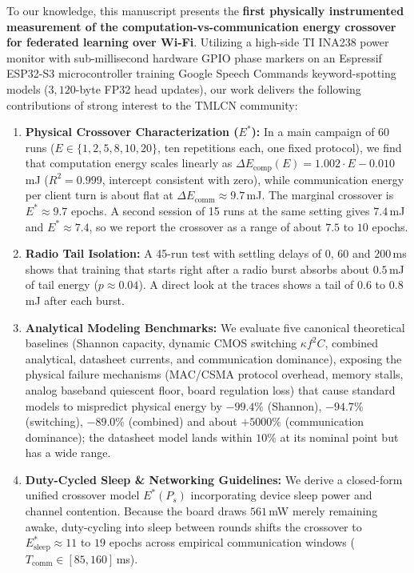 \documentclass[11pt,a4paper]{article}
\begin{document}
\vspace{0.5em}
\noindent
To our knowledge, this manuscript presents the \textbf{first physically instrumented measurement of the computation-vs-communication energy crossover for federated learning over Wi-Fi}. Utilizing a high-side TI INA238 power monitor with sub-millisecond hardware GPIO phase markers on an Espressif ESP32-S3 microcontroller training Google Speech Commands keyword-spotting models ($3{,}120$-byte FP32 head updates), our work delivers the following contributions of strong interest to the TMLCN community:
\begin{enumerate}
    \item \textbf{Physical Crossover Characterization ($E^*$):} In a main campaign of 60 runs ($E \in \{1, 2, 5, 8, 10, 20\}$, ten repetitions each, one fixed protocol), we find that computation energy scales linearly as $\Delta E_{\text{comp}}(E) = 1.002 \cdot E - 0.010$\,mJ ($R^2 = 0.999$, intercept consistent with zero), while communication energy per client turn is about flat at $\Delta E_{\text{comm}} \approx 9.7$\,mJ. The marginal crossover is $E^* \approx 9.7$ epochs. A second session of 15 runs at the same setting gives $7.4$\,mJ and $E^* \approx 7.4$, so we report the crossover as a range of about $7.5$ to $10$ epochs.
    \item \textbf{Radio Tail Isolation:} A 45-run test with settling delays of $0$, $60$ and $200$\,ms shows that training that starts right after a radio burst absorbs about $0.5$\,mJ of tail energy ($p \approx 0.04$). A direct look at the traces shows a tail of $0.6$ to $0.8$\,mJ after each burst.
    \item \textbf{Analytical Modeling Benchmarks:} We evaluate five canonical theoretical baselines (Shannon capacity, dynamic CMOS switching $\kappa f^2 C$, combined analytical, datasheet currents, and communication dominance), exposing the physical failure mechanisms (MAC/CSMA protocol overhead, memory stalls, analog baseband quiescent floor, board regulation loss) that cause standard models to mispredict physical energy by $-99.4\%$ (Shannon), $-94.7\%$ (switching), $-89.0\%$ (combined) and about $+5000\%$ (communication dominance); the datasheet model lands within $10\%$ at its nominal point but has a wide range.
    \item \textbf{Duty-Cycled Sleep \& Networking Guidelines:} We derive a closed-form unified crossover model $E^*(P_s)$ incorporating device sleep power and channel contention. Because the board draws $561$\,mW merely remaining awake, duty-cycling into sleep between rounds shifts the crossover to $E^*_{\text{sleep}} \approx 11$ to $19$ epochs across empirical communication windows ($T_{\text{comm}} \in [85, 160]$\,ms).

\end{enumerate}
\end{document}
